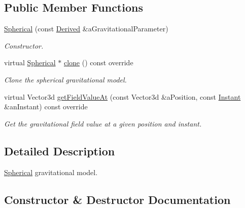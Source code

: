 \subsection*{Public Member Functions}
\begin{DoxyCompactItemize}
\item 
\hyperlink{classostk_1_1physics_1_1environment_1_1gravitational_1_1_spherical_aa0181210c54a42a0b6e808d6e6811d6b}{Spherical} (const \hyperlink{classostk_1_1physics_1_1units_1_1_derived}{Derived} \&a\+Gravitational\+Parameter)
\begin{DoxyCompactList}\small\item\em Constructor. \end{DoxyCompactList}\item 
virtual \hyperlink{classostk_1_1physics_1_1environment_1_1gravitational_1_1_spherical}{Spherical} $\ast$ \hyperlink{classostk_1_1physics_1_1environment_1_1gravitational_1_1_spherical_ac9f63de9656589a27a77e7a8d48836bd}{clone} () const override
\begin{DoxyCompactList}\small\item\em Clone the spherical gravitational model. \end{DoxyCompactList}\item 
virtual Vector3d \hyperlink{classostk_1_1physics_1_1environment_1_1gravitational_1_1_spherical_a37243cf671418b0cb9eff229101b5e96}{get\+Field\+Value\+At} (const Vector3d \&a\+Position, const \hyperlink{classostk_1_1physics_1_1time_1_1_instant}{Instant} \&an\+Instant) const override
\begin{DoxyCompactList}\small\item\em Get the gravitational field value at a given position and instant. \end{DoxyCompactList}\end{DoxyCompactItemize}


\subsection{Detailed Description}
\hyperlink{classostk_1_1physics_1_1environment_1_1gravitational_1_1_spherical}{Spherical} gravitational model. 

\subsection{Constructor \& Destructor Documentation}
\mbox{\label{classostk_1_1physics_1_1environment_1_1gravitational_1_1_spherical_aa0181210c54a42a0b6e808d6e6811d6b}} 
